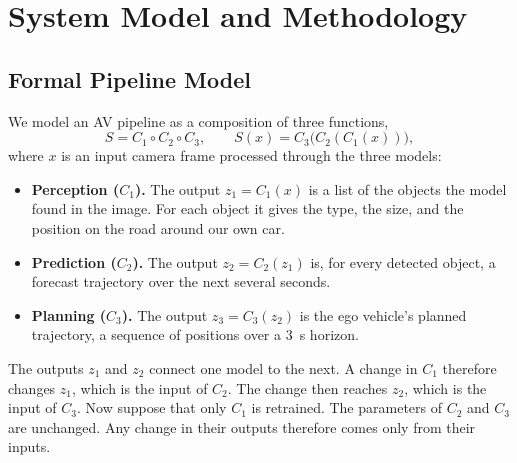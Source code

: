\documentclass[conference]{IEEEtran}
\begin{document}
\section{System Model and Methodology}
\label{sec:method}

\subsection{Formal Pipeline Model}
We model an AV pipeline as a composition of three functions,
\begin{equation}
S = C_1 \circ C_2 \circ C_3,
\qquad
S(x) = C_3\bigl(C_2(C_1(x))\bigr),
\label{eq:comp}
\end{equation}
where $x$ is an input camera frame processed through the three models:
\begin{itemize}
\item \textbf{Perception ($C_1$).} The output $z_1 = C_1(x)$ is a list of the objects the model found in the image. For each object it gives the type, the size, and the position on the road around our own car.
\item \textbf{Prediction ($C_2$).} The output $z_2 = C_2(z_1)$ is, for every
detected object, a forecast trajectory over the next several seconds.
\item \textbf{Planning ($C_3$).} The output $z_3 = C_3(z_2)$ is the ego vehicle's
planned trajectory, a sequence of positions over a $3$~s horizon.
\end{itemize}
The outputs $z_1$ and $z_2$ connect one model to the next. A change in $C_1$
therefore changes $z_1$, which is the input of $C_2$. The change then reaches
$z_2$, which is the input of $C_3$. Now suppose that only $C_1$ is retrained. The
parameters of $C_2$ and $C_3$ are unchanged. Any change in their outputs
therefore comes only from their inputs.
\end{document}
